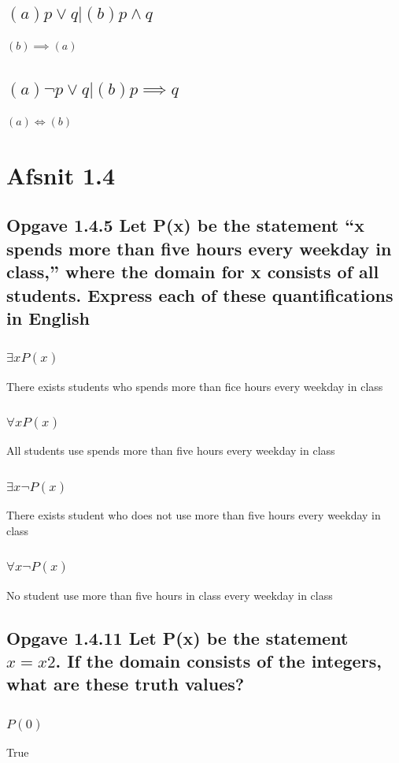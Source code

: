 \documentclass[12pt, a4paper]{report}
\begin{document}
			\subsection{$(a) p\lor q | (b) p \land q$}
				$(b)\implies (a)$
			\subsection{$(a)\neg p \lor q | (b) p\implies q$}
				$(a)\iff(b)$

		\section{Afsnit 1.4}			
			\setcounter{subsection}{4}
			\subsection{Opgave 1.4.5 Let P(x) be the statement “x spends more than five hours every weekday in class,” where the domain for x consists of all students. Express each of these quantifications in English}
				\subsubsection{$\exists x P(x)$}
					There exists students who spends more than fice hours every weekday in class
				\subsubsection{$\forall x P(x)$}
					All students use spends more than five hours every weekday in class
				\subsubsection{$\exists x\neg P(x)$}
					There exists student who does not use more than five hours every weekday in class
				\subsubsection{$\forall x \neg P(x)$}
					No student use more than five hours in class every weekday in class
			\setcounter{subsection}{10}
			\subsection{Opgave 1.4.11 Let P(x) be the statement $x = x2$. If the domain consists of the integers, what are these truth values?}
				\subsubsection{$P(0)$}
					True
\end{document}
